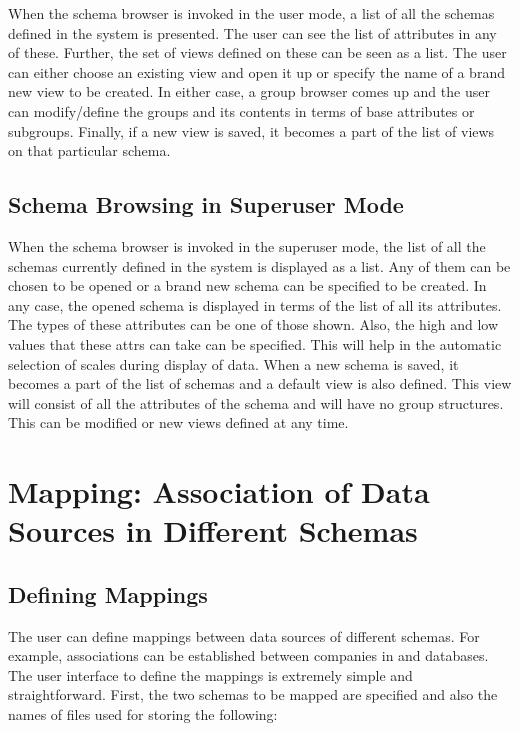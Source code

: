 When the schema browser is invoked in the user mode, a list of all the
schemas defined in the system is presented. The user can see the list
of attributes in any of these. Further, the set of views defined on
these can be seen as a list.  The user can either choose an existing
view and open it up or specify the name of a brand new view to be
created. In either case, a group browser comes up and the user can
modify/define the groups and its contents in terms of base attributes
or subgroups. Finally, if a new view is saved, it becomes a part of
the list of views on that particular schema.

\subsection{Schema Browsing in Superuser Mode}

When the schema browser is invoked in the superuser mode, the list of
all the schemas currently defined in the system is displayed as a
list. Any of them can be chosen to be opened or a brand new schema can
be specified to be created. In any case, the opened schema is
displayed in terms of the list of all its attributes. The types of
these attributes can be one of those shown. Also, the high and low
values that these attrs can take can be specified.  This will help in
the automatic selection of scales during display of data. When a new
schema is saved, it becomes a part of the list of schemas and a
default view is also defined.  This view will consist of all the
attributes of the schema and will have no group structures. This can
be modified or new views defined at any time.

\section{Mapping: Association of Data Sources in Different Schemas}

\subsection{Defining Mappings}

The user can define mappings between data sources of different
schemas.  For example, associations can be established between
companies in  and  databases. The user
interface to define the mappings is extremely simple and
straightforward. First, the two schemas to be mapped are specified and
also the names of files used for storing the following:

